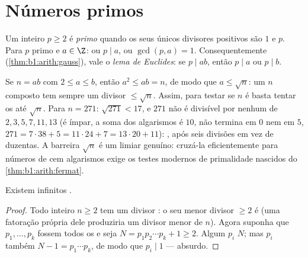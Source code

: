 \section{Números primos}

\begin{definition}\label{def:b1:arith:prime}
Um inteiro $p \geq 2$ é \emph{primo} quando os
seus únicos divisores positivos são $1$ e $p$. Para $p$ primo e $a \in \Z$:
ou $p \mid a$, ou $\gcd(p, a) = 1$. Consequentemente
(\cref{thm:b1:arith:gauss}), vale o \emph{lema de Euclides}: se $p \mid
ab$, então $p \mid a$ ou $p \mid b$.
\end{definition}

\begin{remark}\label{rem:b1:arith:trialdivision}
Se $n = ab$ com $2 \leq a \leq b$, então $a^2 \leq ab = n$, de modo que $a
\leq \sqrt n$: um $n$ composto tem sempre um divisor  $\leq
\sqrt n$. Assim, para testar se $n$ é  basta tentar
os  até $\sqrt n$. Para $n = 271$: $\sqrt{271} < 17$, e
$271$ não é divisível por nenhum de $2, 3, 5, 7, 11, 13$ (é ímpar,
a soma dos algarismos é $10$, não termina em $0$ nem em $5$, $271 = 7\cdot38 + 5 =
11\cdot24 + 7 = 13\cdot20 + 11$): , após seis divisões
em vez de duzentas. A barreira $\sqrt n$ é um limiar genuíno:
cruzá-la eficientemente para números de cem algarismos exige
os testes modernos de primalidade nascidos do
\cref{thm:b1:arith:fermat}.
\end{remark}

\begin{theorem}[Euclides]\label{thm:b1:arith:euclidprimes}
Existem infinitos .
\end{theorem}

\begin{proof}
Todo inteiro $n \geq 2$ tem um divisor : o seu menor divisor
$\geq 2$ é  (uma fatoração própria dele produziria um
divisor menor de $n$). Agora suponha que $p_1, \dots, p_k$ fossem todos os
 e seja $N = p_1 p_2 \cdots p_k + 1 \geq 2$. Algum  $p_i$
 $N$; mas $p_i$ também  $N - 1 = p_1\cdots p_k$, de modo que $p_i
\mid 1$ --- absurdo.
\end{proof}


